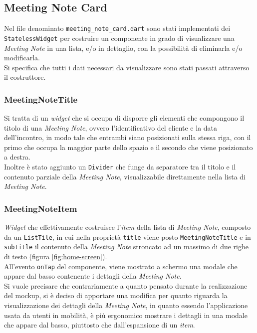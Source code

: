 \subsection{Meeting Note Card}
\label{subsec:meeting-note-card}

Nel file denominato \lstinline{meeting_note_card.dart} sono stati implementati dei \lstinline{StatelessWidget} per costruire un componente in grado di visualizzare una \emph{Meeting Note} in una lista, e/o in dettaglio, con la possibilità di eliminarla e/o modificarla. \\
Si specifica che tutti i dati necessari da visualizzare sono stati passati attraverso il costruttore.

\subsubsection*{MeetingNoteTitle}
\label{subsubsec:meeting-note-title}

Si tratta di un \emph{widget} che si occupa di disporre gli elementi che compongono il titolo di una 
\emph{Meeting Note}, ovvero l'identificativo del cliente e la data dell'incontro, in modo tale che entrambi siano posizionati sulla stessa riga, con il primo che occupa la maggior parte dello spazio e il secondo che viene posizionato a destra.\\
Inoltre è stato aggiunto un \lstinline{Divider}\cite{site:divider} che funge da separatore tra il titolo e il contenuto parziale della \emph{Meeting Note}, visualizzabile direttamente nella lista di \emph{Meeting Note}.

\subsubsection*{MeetingNoteItem}
\label{subsubsec:meeting-note-item}

\emph{Widget} che effettivamente costruisce l'\emph{item} della lista di \emph{Meeting Note}, composto da un \lstinline{ListTile}\cite{site:list-tile}, in cui nella proprietà \lstinline{title} viene posto \lstinline{MeetingNoteTitle} e in \lstinline{subtitle} il contenuto della \emph{Meeting Note} stroncato ad un massimo di due righe di testo (figura \ref{fig:home-screen}).\\
All'evento \lstinline{onTap} del componente, viene mostrato a schermo una modale che appare dal basso contenente i dettagli della \emph{Meeting Note}.\\
Si vuole precisare che contrariamente a quanto pensato durante la realizzazione del \gls{mockup}\glsoccur, si è deciso di apportare una modifica per quanto riguarda la visualizzazione dei dettagli della \emph{Meeting Note}, in quanto essendo l'applicazione usata da utenti in mobilità, è più ergonomico mostrare i dettagli in una modale che appare dal basso, piuttosto che dall'espansione di un \emph{item}.

